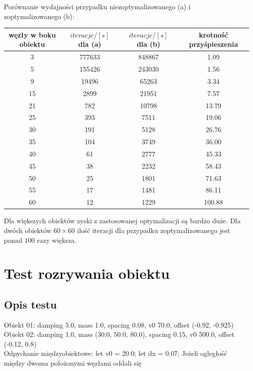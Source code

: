 \documentclass[12pt, letterpaper]{report}
\begin{document}
    Porównanie wydajności przypadku niezoptymalizowanego (a) i zoptymalizowanego (b):
    \begin{center}
        \begin{tabular}{||c c c c||} 
         \hline
         węzły w boku obiektu & $iteracje / [s]$ dla (a) & $iteracje / [s]$ dla (b) & krotność przyśpieszenia \\ [0.5ex] 
         \hline\hline
         3 & 777633 & 848867 & 1.09 \\ 
         \hline
         5 & 155426 & 243030 & 1.56 \\
         \hline
         9 & 19496 & 65263 & 3.34 \\
         \hline
         15 & 2899 & 21951 & 7.57 \\
         \hline
         21 & 782 & 10798 & 13.79 \\
         \hline
         25 & 393 & 7511 & 19.06 \\
         \hline
         30 & 191 & 5128 & 26.76 \\
         \hline
         35 & 104 & 3749 & 36.00 \\
         \hline
         40 & 61 & 2777 & 45.33 \\ 
         \hline
         45 & 38 & 2232 & 58.43 \\ 
         \hline
         50 & 25 & 1801 & 71.63 \\
         \hline
         55 & 17 & 1481 & 86.11 \\ 
         \hline
         60 & 12 & 1229 & 100.88 \\ [1ex] 
         \hline
        \end{tabular}
    \end{center}
    
    Dla większych obiektów zyski z zastosowanej optymalizacji są bardzo duże. Dla dwóch obiektów
    $60 \times 60$ ilość iteracji dla przypadku zoptymalizowanego jest ponad $100$ razy większa.

    \section{Test rozrywania obiektu}
    \subsection{Opis testu}
    Obiekt 01: damping 5.0, mass 1.0, spacing 0.08, v0 70.0, offset (-0.92, -0.925) \\
    Obiekt 02: damping 1.0, mass (30.0, 50.0, 80.0), spacing 0.15, v0 500.0, offset (-0.12, 0.8) \\
    Odpychanie międzyobiektowe:
    let v0 = 20.0;
    let dx = 0.07;
    Jeżeli ogległość między dwoma położonymi węzłami  oddali się 
\end{document}
